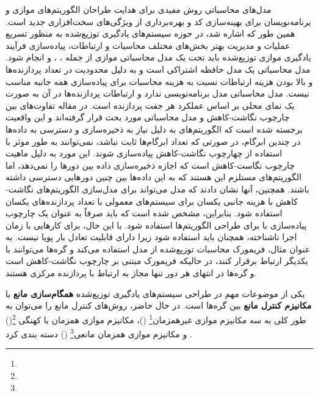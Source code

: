 مدل‌های محاسباتی روش مفیدی برای هدایت طراحان الگوریتم‌های موازی و برنامه‌نویسان برای بهینه‌سازی کد و بهره‌برداری از ویژگی‌های سخت‌افزاری جدید است. همین طور که اشاره شد، در حوزه سیستم‌های یادگیری توزیع‌شده به منظور تسریع عملیات و مدیریت بهتر بخش‌های مختلف محاسبات و ارتباطات، پیاده‌سازی فرآیند یادگیری موازی توزیع‌شده باید تحت یک مدل محاسباتی موازی از جمله  ، ،  و  انجام شود. مدل محاسباتی  یک مدل حافظه اشتراکی است و به دلیل محدودیت در تعداد پردازنده‌ها و بالا بودن هزینه ارتباطات نسبت به هزینه محاسبات برای پیاده‌سازی همه جانبه مناسب نیست. مدل محاسباتی  مدل برنامه‌نویسی ندارد و ارتباطات پردازنده‌ها در آن به صورت یک نمای محلی بر اساس عملکرد هر جفت پردازنده است. در مقاله \cite{BSP2012} تفاوت‌های بین چارچوب نگاشت-کاهش و مدل محاسباتی  مورد بحث قرار گرفته‌اند و این واقعیت برجسته شده است که الگوریتم‌های  به دلیل نیاز به ذخیره‌سازی و دسترسی به داده‌ها در چندین ابرگام، در صورتی که تعداد ابرگام‌ها ثابت نباشد، نمی‌توانند به طور موثر با استفاده از چهارچوب نگاشت-کاهش پیاده‌سازی شوند. این مورد به دلیل ماهیت چارچوب نگاست-کاهش است که اجازه ذخیره‌سازی داده بین دورها را نمی‌دهد، اما الگوریتم‌های  مستلزم این هستند که به این داده‌ها بین چنین دورهایی دسترسی داشته باشند. همچنین، آنها نشان دادند که مدل  می‌تواند برای مدل‌سازی الگوریتم‌های نگاشت-کاهش با هزینه جانبی یکسان برای سیستم‌های معمولی با تعداد پردازنده‌های یکسان استفاده شود. بنابراین، مشخص شده است که  باید صرفاً به عنوان یک چارچوب پیاده‌سازی با  برای طراحی الگوریتم‌ها استفاده شود. با این حال، برای کارهایی با زمان اجرا ناشناخته،  همچنان باید استفاده شود زیرا  دارای قابلیت تعادل بار پویا نیست. به عنوان مثال، فریمورک محاسبات توزیع‌شده از مدل  استفاده می‌کند و گره‌ها می‌توانند با یکدیگر ارتباط برقرار کنند، در حالیکه فریمورک  مبتنی بر چارچوب نگاشت-کاهش است و گره‌ها در انتهای هر دور تنها  مجاز به ارتباط با پردازنده مرکزی هستند. 

یکی از موضوعات مهم در طراحی سیستم‌های یادگیری توزیع‌شده \textbf{همگام‌سازی مانع}  یا \textbf{مکانیزم کنترل مانع} بین گره‌ها است. در حال حاضر، روش‌های کنترل مانع را می‌توان به طور کلی به سه مکانیزم موازی غیرهمزمان\footnote{} ()، مکانیزم موازی همزمان با کهنگی \footnote{}() و مکانیزم موازی همزمان مانعی\footnote{} () دسته بندی کرد \cite{NIPS2012}. 

